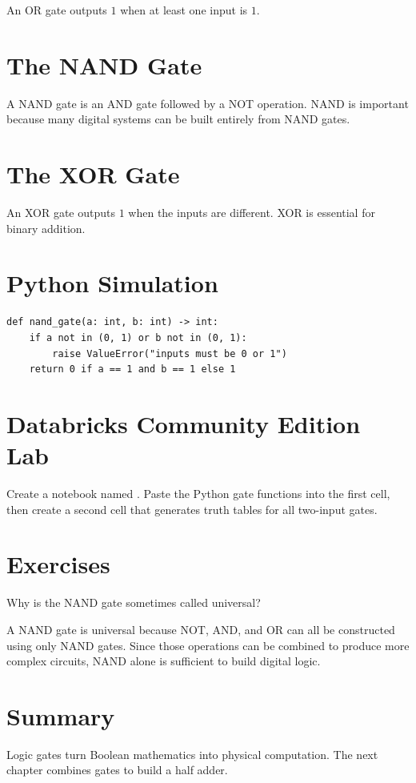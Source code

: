An OR gate outputs \(1\) when at least one input is \(1\).

\section{The NAND Gate}

A NAND gate is an AND gate followed by a NOT operation. NAND is important because many digital systems can be built entirely from NAND gates.

\section{The XOR Gate}

An XOR gate outputs \(1\) when the inputs are different. XOR is essential for binary addition.

\section{Python Simulation}

\begin{lstlisting}
def nand_gate(a: int, b: int) -> int:
    if a not in (0, 1) or b not in (0, 1):
        raise ValueError("inputs must be 0 or 1")
    return 0 if a == 1 and b == 1 else 1
\end{lstlisting}

\section{Databricks Community Edition Lab}

Create a notebook named . Paste the Python gate functions into the first cell, then create a second cell that generates truth tables for all two-input gates.

\section{Exercises}

\begin{exercise}
Why is the NAND gate sometimes called universal?
\end{exercise}

\begin{solution}
A NAND gate is universal because NOT, AND, and OR can all be constructed using only NAND gates. Since those operations can be combined to produce more complex circuits, NAND alone is sufficient to build digital logic.
\end{solution}

\section{Summary}

Logic gates turn Boolean mathematics into physical computation. The next chapter combines gates to build a half adder.
